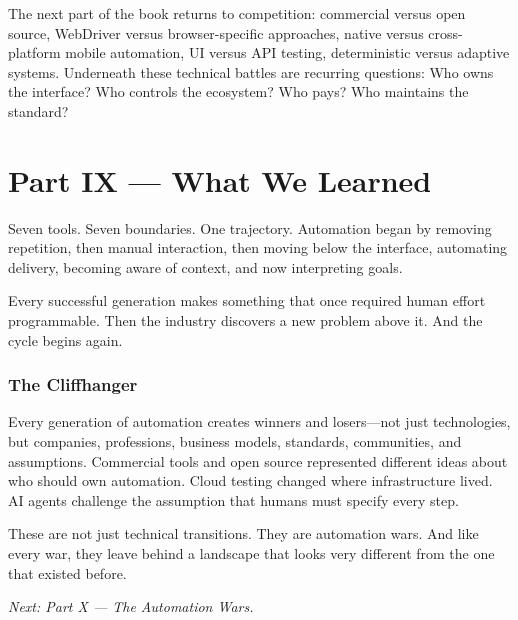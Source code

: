 \documentclass[11pt,twoside]{book}
\begin{document}
The next part of the book returns to competition: commercial versus open source, WebDriver versus browser-specific approaches, native versus cross-platform mobile automation, UI versus API testing, deterministic versus adaptive systems. Underneath these technical battles are recurring questions: Who owns the interface? Who controls the ecosystem? Who pays? Who maintains the standard?

\chapter*{Part IX — What We Learned}

Seven tools. Seven boundaries. One trajectory. Automation began by removing repetition, then manual interaction, then moving below the interface, automating delivery, becoming aware of context, and now interpreting goals. 

Every successful generation makes something that once required human effort programmable. Then the industry discovers a new problem above it. And the cycle begins again.

\subsection*{The Cliffhanger}

Every generation of automation creates winners and losers---not just technologies, but companies, professions, business models, standards, communities, and assumptions. Commercial tools and open source represented different ideas about who should own automation. Cloud testing changed where infrastructure lived. AI agents challenge the assumption that humans must specify every step. 

These are not just technical transitions. They are automation wars. And like every war, they leave behind a landscape that looks very different from the one that existed before.

\begin{center}
\vspace{1em}
\textit{Next: Part X — The Automation Wars.}
\end{center}
\end{document}
